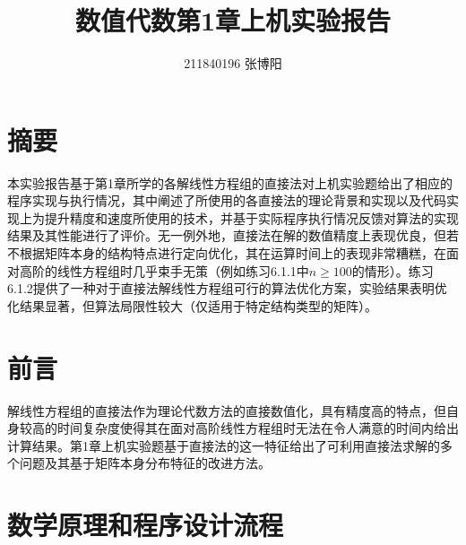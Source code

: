 \documentclass[UTF8,a4paper,10pt]{ctexart}
\title{\textbf{数值代数第1章上机实验报告}}
\author{ 211840196 张博阳 }
\date{}
\begin{document}
    \maketitle
 
    \section*{摘要}
        \par
        本实验报告基于第1章所学的各解线性方程组的直接法对上机实验题给出了相应的程序实现与执行情况，其中阐述了所使用的各直接法的理论背景和实现以及代码实现上为提升精度和速度所使用的技术，并基于实际程序执行情况反馈对算法的实现结果及其性能进行了评价。无一例外地，直接法在解的数值精度上表现优良，但若不根据矩阵本身的结构特点进行定向优化，其在运算时间上的表现非常糟糕，在面对高阶的线性方程组时几乎束手无策（例如练习6.1.1中$n \ge 100$的情形）。练习6.1.2提供了一种对于直接法解线性方程组可行的算法优化方案，实验结果表明优化结果显著，但算法局限性较大（仅适用于特定结构类型的矩阵）。

    \section{前言}
        \par
        解线性方程组的直接法作为理论代数方法的直接数值化，具有精度高的特点，但自身较高的时间复杂度使得其在面对高阶线性方程组时无法在令人满意的时间内给出计算结果。第1章上机实验题基于直接法的这一特征给出了可利用直接法求解的多个问题及其基于矩阵本身分布特征的改进方法。
 
    \section{数学原理和程序设计流程}
\end{document}
